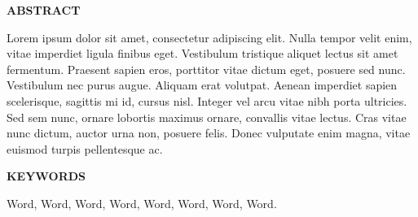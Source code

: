 \newpage
\thispagestyle{empty}
\begin{center}
    \textbf{ABSTRACT}
\end{center}
Lorem ipsum dolor sit amet, consectetur adipiscing elit. Nulla tempor velit enim, vitae imperdiet ligula finibus eget. Vestibulum tristique aliquet lectus sit amet fermentum. Praesent sapien eros, porttitor vitae dictum eget, posuere sed nunc. Vestibulum nec purus augue. Aliquam erat volutpat. Aenean imperdiet sapien scelerisque, sagittis mi id, cursus nisl. Integer vel arcu vitae nibh porta ultricies. Sed sem nunc, ornare lobortis maximus ornare, convallis vitae lectus. Cras vitae nunc dictum, auctor urna non, posuere felis. Donec vulputate enim magna, vitae euismod turpis pellentesque ac.

\begin{center}
    \textbf{KEYWORDS}
\end{center}
Word, Word, Word, Word, Word, Word, Word, Word.
